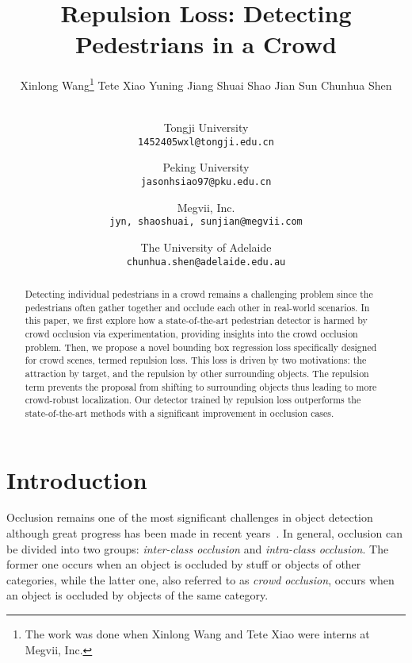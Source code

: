 \documentclass[10pt,twocolumn,letterpaper]{article}
\begin{document}
\title{Repulsion Loss: Detecting Pedestrians in a Crowd}

\author{Xinlong Wang\thanks{The work was done when Xinlong Wang and Tete Xiao were interns at Megvii, Inc.} \quad Tete Xiao \quad Yuning Jiang \quad Shuai Shao \quad Jian Sun \quad Chunhua Shen \\ \\
\and
Tongji University\\
{\tt\small 1452405wxl@tongji.edu.cn}\\
\and
Peking University\\
{\tt\small jasonhsiao97@pku.edu.cn}\\
\and
Megvii, Inc. \\
{\tt\small jyn, shaoshuai, sunjian@megvii.com}\\
\and
The University of Adelaide\\
{\tt\small chunhua.shen@adelaide.edu.au}\\
}
\maketitle



\begin{abstract}
Detecting individual pedestrians in a crowd remains a challenging problem since the pedestrians often gather together and occlude each other in real-world scenarios. In this paper, we first explore how a state-of-the-art pedestrian detector is harmed by crowd occlusion via experimentation, providing insights into the crowd occlusion problem. Then, we propose a novel bounding box regression loss specifically designed for crowd scenes, termed repulsion loss. This loss is driven by two motivations: the attraction by target, and the repulsion by other surrounding objects. The repulsion term prevents the proposal from shifting to surrounding objects thus leading to more crowd-robust localization. Our detector trained by repulsion loss outperforms the state-of-the-art methods with a significant improvement in occlusion cases.
\end{abstract}


\vspace{-0.2cm}
\section{Introduction}
\label{sec:intro}


Occlusion remains one of the most significant challenges in object detection although great progress has been made in recent years~\cite{Girshick_2014_CVPR,Girshick_2015_ICCV,NIPS2015_5638,Lin_2017_CVPR,cai2016unified,Lin_2017_ICCV,he2017mask,dai2016r}. In general, occlusion can be divided into two groups: {\it inter-class occlusion} and {\it intra-class occlusion}. The former one occurs when an object is occluded by stuff or objects of other categories, while the latter one, also referred to as {\it crowd occlusion}, occurs when an object is occluded by objects of the same category.
\end{document}
